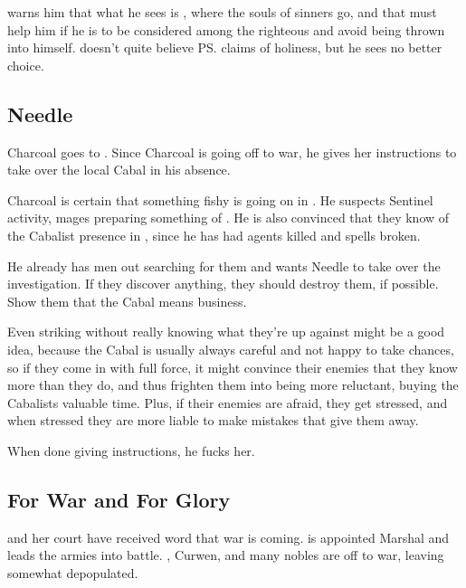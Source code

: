 \Psyrex{} warns him that what he sees is \Itzach, where the souls of sinners go, and that \Icor{} must help him if he is to be considered among the righteous and avoid being thrown into \Itzach{} himself. 
\Icor{} doesn't quite believe \ps{\Psyrex}{} claims of holiness, but he sees no better choice. 







\subsection{Needle}
Charcoal goes to . Since Charcoal is going off to war, he gives her instructions to take over the local Cabal in his absence. 

Charcoal is certain that something fishy is going on in \Malcur. He suspects Sentinel activity, mages preparing something of . He is also convinced that they know of the Cabalist presence in \Malcur, since he has had agents killed and spells broken. 

He already has men out searching for them and wants Needle to take over the investigation. If they discover anything, they should destroy them, if possible. Show them that the Cabal means business. 

Even striking without really knowing what they're up against might be a good idea, because the Cabal is usually always careful and not happy to take chances, so if they come in with full force, it might convince their enemies that they know more than they do, and thus frighten them into being more reluctant, buying the Cabalists valuable time. Plus, if their enemies are afraid, they get stressed, and when stressed they are more liable to make mistakes that give them away. 

When done giving instructions, he fucks her. 









\subsection{For War and For Glory}
\Tiroco{} and her court have received word that war is coming. 
 is appointed Marshal and leads the armies into battle. 
\Cobrel, Curwen, \Dornaer{} and many nobles are off to war, leaving \Malcur somewhat depopulated. 

